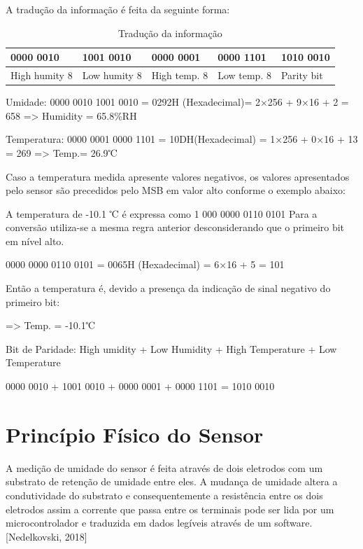 A tradução da informação é feita da seguinte forma:

\begin{table}[H]
	\centering
	\caption{Tradução da informação}
	\label{my-label}
	\begin{tabular}{|l|l|l|l|l|}
		\hline
		{0000 0010} & {1001 0010} & {0000 0001} & {0000 1101} & {1010 0010} \\ \hline
		High humity 8   & Low humity 8    & High temp. 8    & Low temp. 8     & Parity bit      \\ \hline
	\end{tabular}
\end{table}


Umidade: 0000 0010  1001 0010 = 0292H (Hexadecimal)= 2×256 + 9×16 + 2 = 658    => Humidity = 65.8\%RH

Temperatura: 0000 0001  0000 1101 = 10DH(Hexadecimal) = 1×256 + 0×16 + 13 = 269   => Temp.= 26.9℃ 

Caso a temperatura medida apresente valores negativos, os valores apresentados pelo sensor são precedidos pelo MSB em valor alto conforme o exemplo abaixo:

A temperatura de -10.1 ℃ é expressa como 1 000 0000 0110 0101
Para a conversão utiliza-se a mesma regra anterior desconsiderando que o primeiro bit em nível alto.

0000 0000 0110 0101 = 0065H (Hexadecimal) = 6×16 + 5  = 101  

Então a temperatura é, devido a presença da indicação de sinal negativo do primeiro bit:

=> Temp. = -10.1℃ 

Bit de Paridade: High umidity + Low Humidity + High Temperature + Low Temperature

0000 0010 + 1001 0010 + 0000 0001 + 0000 1101 = 1010 0010

\section{Princípio Físico do Sensor}

A medição de umidade do sensor é feita através de dois eletrodos com um substrato de retenção de umidade entre eles. A mudança de umidade altera a condutividade do substrato e consequentemente a resistência entre os dois eletrodos assim a corrente que passa entre os terminais pode ser lida por um microcontrolador e traduzida em dados legíveis através de um software.[Nedelkovski, 2018]

